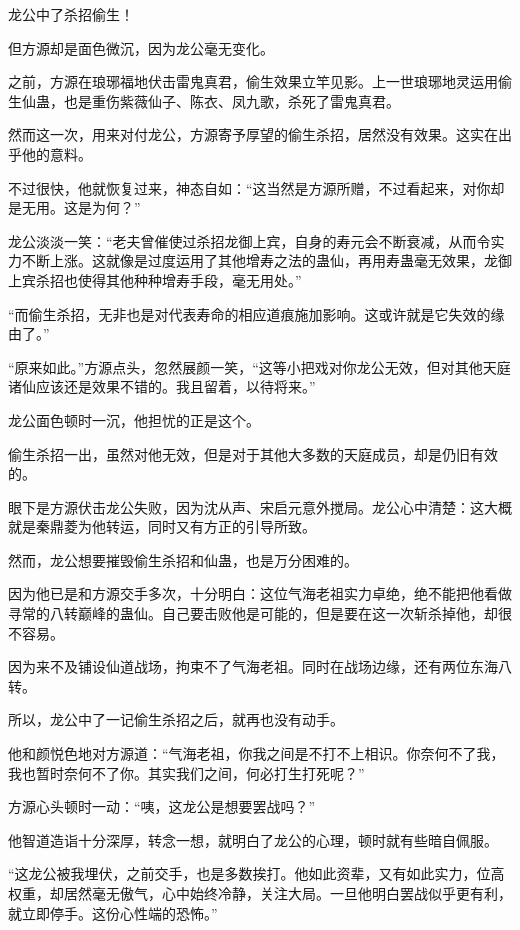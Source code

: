 
\begin{this_body}



龙公中了杀招偷生！

但方源却是面色微沉，因为龙公毫无变化。

之前，方源在琅琊福地伏击雷鬼真君，偷生效果立竿见影。上一世琅琊地灵运用偷生仙蛊，也是重伤紫薇仙子、陈衣、凤九歌，杀死了雷鬼真君。

然而这一次，用来对付龙公，方源寄予厚望的偷生杀招，居然没有效果。这实在出乎他的意料。

不过很快，他就恢复过来，神态自如：“这当然是方源所赠，不过看起来，对你却是无用。这是为何？”

龙公淡淡一笑：“老夫曾催使过杀招龙御上宾，自身的寿元会不断衰减，从而令实力不断上涨。这就像是过度运用了其他增寿之法的蛊仙，再用寿蛊毫无效果，龙御上宾杀招也使得其他种种增寿手段，毫无用处。”

“而偷生杀招，无非也是对代表寿命的相应道痕施加影响。这或许就是它失效的缘由了。”

“原来如此。”方源点头，忽然展颜一笑，“这等小把戏对你龙公无效，但对其他天庭诸仙应该还是效果不错的。我且留着，以待将来。”

龙公面色顿时一沉，他担忧的正是这个。

偷生杀招一出，虽然对他无效，但是对于其他大多数的天庭成员，却是仍旧有效的。

眼下是方源伏击龙公失败，因为沈从声、宋启元意外搅局。龙公心中清楚：这大概就是秦鼎菱为他转运，同时又有方正的引导所致。

然而，龙公想要摧毁偷生杀招和仙蛊，也是万分困难的。

因为他已是和方源交手多次，十分明白：这位气海老祖实力卓绝，绝不能把他看做寻常的八转巅峰的蛊仙。自己要击败他是可能的，但是要在这一次斩杀掉他，却很不容易。

因为来不及铺设仙道战场，拘束不了气海老祖。同时在战场边缘，还有两位东海八转。

所以，龙公中了一记偷生杀招之后，就再也没有动手。

他和颜悦色地对方源道：“气海老祖，你我之间是不打不上相识。你奈何不了我，我也暂时奈何不了你。其实我们之间，何必打生打死呢？”

方源心头顿时一动：“咦，这龙公是想要罢战吗？”

他智道造诣十分深厚，转念一想，就明白了龙公的心理，顿时就有些暗自佩服。

“这龙公被我埋伏，之前交手，也是多数挨打。他如此资辈，又有如此实力，位高权重，却居然毫无傲气，心中始终冷静，关注大局。一旦他明白罢战似乎更有利，就立即停手。这份心性端的恐怖。”


\end{this_body}
